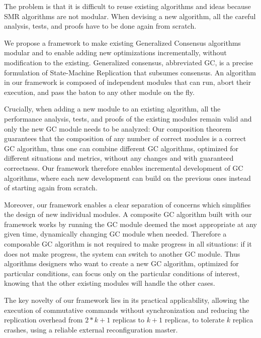 The problem is that it is difficult to reuse existing algorithms and ideas because
SMR algorithms are not modular. When devising a new algorithm, all the careful
analysis, tests, and proofs have to be done again from scratch.

We propose a framework to make existing Generalized Consensus algorithms modular
and to enable adding new optimizations incrementally, without modification to
the existing. Generalized consensus, abbreviated GC, is a precise formulation of
State-Machine Replication that subsumes consensus. An algorithm in our framework
is composed of independent modules that can run, abort their execution, and pass
the baton to any other module on the fly.

Crucially, when adding a new module to an existing algorithm, all the
performance analysis, tests, and proofs of the existing modules remain valid and
only the new GC module needs to be analyzed: Our composition theorem guarantees
that the composition of any number of correct modules is a correct GC algorithm,
thus one can combine different GC algorithms, optimized for different situations
and metrics, without any changes and with guaranteed correctness. Our framework
therefore enables incremental development of GC algorithms, where each new
development can build on the previous ones instead of starting again from
scratch.

Moreover, our framework enables a clear separation of concerns which simplifies
the design of new individual modules. A composite GC algorithm built with our
framework works by running the GC module deemed the most appropriate at any
given time, dynamically changing GC module when needed. Therefore a composable
GC algorithm is not required to make progress in all situations: if it does
not make progress, the system can switch to another GC module. Thus algorithms
designers who want to create a new GC algorithm, optimized for particular
conditions, can focus only on the particular conditions of interest, knowing
that the other existing modules will handle the other cases.

The key novelty of our framework lies in its practical applicability, allowing
the execution of commutative commands without synchronization and reducing the
replication overhead from $2*k+1$ replicas to $k+1$ replicas, to tolerate $k$
replica crashes, using a reliable external reconfiguration master.

